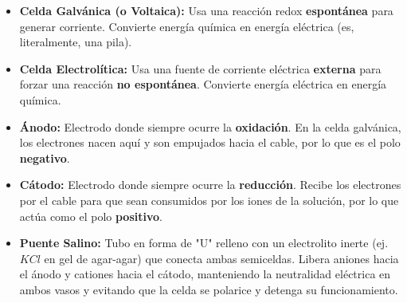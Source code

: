 \documentclass[letterpaper, 12pt, twoside]{article}
\newenvironment{formulabox}[1]{%
    \begin{tcolorbox}[colback=rojoSuave, colframe=rojoFuerte,
        title=\textbf{#1}, fonttitle=\bfseries]
}{%
    \end{tcolorbox}
}
\begin{document}
\begin{formulabox}{Tipos de Celda, Electrodos y Puente Salino}
    \begin{itemize}
        \item \textbf{Celda Galvánica (o Voltaica):} Usa una reacción redox \textbf{espontánea} para generar corriente. Convierte energía química en energía eléctrica (es, literalmente, una pila). \vspace{0.5cm}    
        \item \textbf{Celda Electrolítica:} Usa una fuente de corriente eléctrica \textbf{externa} para forzar una reacción \textbf{no espontánea}. Convierte energía eléctrica en energía química. \vspace{0.5cm}
        
        \item \textbf{Ánodo:} Electrodo donde siempre ocurre la \textbf{oxidación}. En la celda galvánica, los electrones nacen aquí y son empujados hacia el cable, por lo que es el polo \textbf{negativo}. \vspace{0.5cm}
        \item \textbf{Cátodo:} Electrodo donde siempre ocurre la \textbf{reducción}. Recibe los electrones por el cable para que sean consumidos por los iones de la solución, por lo que actúa como el polo \textbf{positivo}. \vspace{0.25cm}
        \item \textbf{Puente Salino:} Tubo en forma de "U" relleno con un electrolito inerte (ej. $KCl$ en gel de agar-agar) que conecta ambas semiceldas. Libera aniones hacia el ánodo y cationes hacia el cátodo, manteniendo la neutralidad eléctrica en ambos vasos y evitando que la celda se polarice y detenga su funcionamiento.
    \end{itemize}
    \vspace{0.2cm}
    
    \begin{center}
    \end{center}
    
\end{formulabox}
\end{document}
